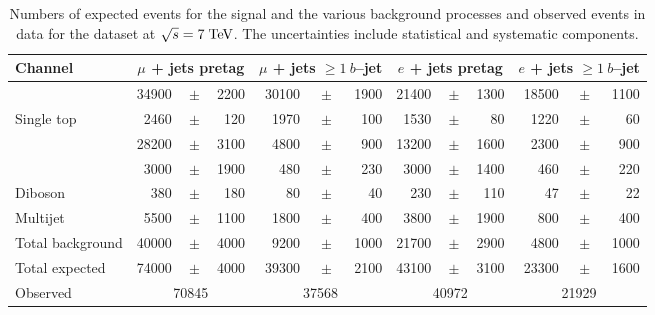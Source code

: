 \begin{table}
  \centering
  \begin{tabular}{ l  rrr  rrr  rrr  rrr }
    \toprule
    Channel & \multicolumn{3}{c}{$\mu$ + jets pretag} & \multicolumn{3}{c}{$\mu$ + jets $\geq1~b$--jet} & \multicolumn{3}{c}{$e$ + jets pretag} & \multicolumn{3}{c}{$e$ + jets $\geq1~b$--jet} \\ 
    \midrule
    \ttbar{}         & 34900 &$\!\!\!\pm\!\!\!$& 2200  & 30100 &$\!\!\!\pm\!\!\!$& 1900  & 21400 &$\!\!\!\pm\!\!\!$& 1300  & 18500 &$\!\!\!\pm\!\!\!$& 1100  \\ %
    Single top       & 2460  &$\!\!\!\pm\!\!\!$& 120   & 1970  &$\!\!\!\pm\!\!\!$& 100   & 1530  &$\!\!\!\pm\!\!\!$& 80    & 1220  &$\!\!\!\pm\!\!\!$& 60   \\ 
    \wjets{}         & 28200 &$\!\!\!\pm\!\!\!$& 3100  & 4800  &$\!\!\!\pm\!\!\!$& 900   & 13200 &$\!\!\!\pm\!\!\!$& 1600  & 2300  &$\!\!\!\pm\!\!\!$& 900  \\
    \zjets{}         & 3000  &$\!\!\!\pm\!\!\!$& 1900  & 480   &$\!\!\!\pm\!\!\!$& 230   & 3000  &$\!\!\!\pm\!\!\!$& 1400  & 460   &$\!\!\!\pm\!\!\!$& 220   \\
    Diboson          & 380   &$\!\!\!\pm\!\!\!$& 180   & 80    &$\!\!\!\pm\!\!\!$& 40    & 230   &$\!\!\!\pm\!\!\!$& 110   & 47    &$\!\!\!\pm\!\!\!$& 22   \\ 
    Multijet      & 5500  &$\!\!\!\pm\!\!\!$& 1100  & 1800
    &$\!\!\!\pm\!\!\!$& 400   & 3800  &$\!\!\!\pm\!\!\!$& 1900  & 800
    &$\!\!\!\pm\!\!\!$& 400  \\ 
    \midrule
    Total background & 40000 &$\!\!\!\pm\!\!\!$& 4000  & 9200
    &$\!\!\!\pm\!\!\!$& 1000  & 21700 &$\!\!\!\pm\!\!\!$& 2900  & 4800
    &$\!\!\!\pm\!\!\!$& 1000  \\ 
    \midrule
    Total expected     & 74000 &$\!\!\!\pm\!\!\!$ & 4000 & 39300
    &$\!\!\!\pm\!\!\!$& 2100  & 43100 &$\!\!\!\pm\!\!\!$& 3100 & 23300
    &$\!\!\!\pm\!\!\!$& 1600  \\
    \midrule
    Observed                & \multicolumn{3}{c}{70845}  & \multicolumn{3}{c}{37568} & \multicolumn{3}{c}{40972}      & \multicolumn{3}{c}{21929} \\
    \bottomrule
  \end{tabular}
  \caption{
    Numbers of expected events for the \ttbar{} signal and the various background 
    processes and observed events in data for the dataset 
    at $\sqrt{s} = 7 \; \mathrm{TeV}{}$.
    The uncertainties include statistical and systematic components.}
  \label{tab:yields2011}
\end{table}


